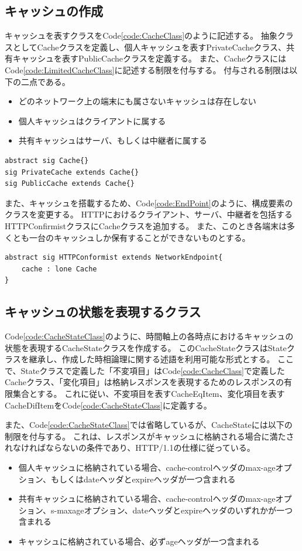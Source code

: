 \documentclass[journal]{IEEEtran}
\begin{document}
\subsection{キャッシュの作成}
\label{sec:CacheClass}
キャッシュを表すクラスをCode\ref{code:CacheClass}のように記述する。
抽象クラスとしてCacheクラスを定義し、個人キャッシュを表すPrivateCacheクラス、共有キャッシュを表すPublicCacheクラスを定義する。
また、CacheクラスにはCode\ref{code:LimitedCacheClass}に記述する制限を付与する。
付与される制限は以下の二点である。
\begin{itemize}
\item どのネットワーク上の端末にも属さないキャッシュは存在しない
\item 個人キャッシュはクライアントに属する
\item 共有キャッシュはサーバ、もしくは中継者に属する
\end{itemize}

\begin{lstlisting}[caption=Cacheクラス, label=code:CacheClass]
abstract sig Cache{}
sig PrivateCache extends Cache{}
sig PublicCache extends Cache{}
\end{lstlisting}

また、キャッシュを搭載するため、Code\ref{code:EndPoint}のように、構成要素のクラスを変更する。
HTTPにおけるクライアント、サーバ、中継者を包括するHTTPConfirmistクラスにCacheクラスを追加する。
また、このとき各端末は多くとも一台のキャッシュしか保有することができないものとする。
\begin{lstlisting}[caption=HTTPを利用するウェブの構成要素, label=code:EndPoint]
abstract sig HTTPConformist extends NetworkEndpoint{
	cache : lone Cache
}
\end{lstlisting}

\subsection{キャッシュの状態を表現するクラス}
\label{sec:CacheState}
Code\ref{code:CacheStateClass}のように、時間軸上の各時点におけるキャッシュの状態を表現するCacheStateクラスを作成する。
このCacheStateクラスはStateクラスを継承し、作成した時相論理に関する述語を利用可能な形式とする。
ここで、Stateクラスで定義した「不変項目」はCode\ref{code:CacheClass}で定義したCacheクラス、「変化項目」は格納レスポンスを表現するためのレスポンスの有限集合とする。
これに従い、不変項目を表すCacheEqItem、変化項目を表すCacheDifItemをCode\ref{code:CacheStateClass}に定義する。

また、Code\ref{code:CacheStateClass}では省略しているが、CacheStateには以下の制限を付与する。
これは、レスポンスがキャッシュに格納される場合に満たされなければならないの条件であり、HTTP/1.1の仕様に従っている。
\begin{itemize}
\item 個人キャッシュに格納されている場合、cache-controlヘッダのmax-ageオプション、もしくはdateヘッダとexpireヘッダが一つ含まれる
\item 共有キャッシュに格納されている場合、cache-controlヘッダのmax-ageオプション、s-maxageオプション、dateヘッダとexpireヘッダのいずれかが一つ含まれる
\item キャッシュに格納されている場合、必ずageヘッダが一つ含まれる
\end{itemize}
\end{document}
